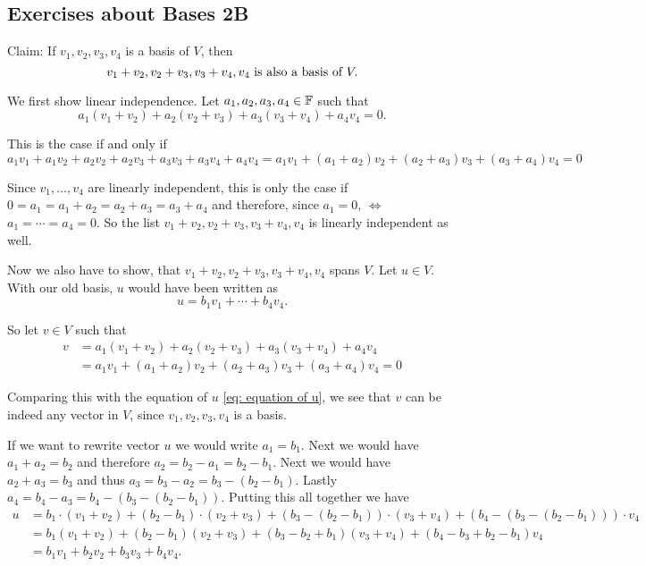 \subsection*{Exercises about Bases 2B}

\setcounter{xrcscount}{5}
\begin{xrcs}
  Claim: If $v_1, v_2, v_3, v_4$ is a basis of $V$, then
  \begin{equation}
    v_1 + v_2, v_2 + v_3, v_3+v_4, v_4 $ is also a basis of $V.
  \end{equation}

  \begin{xprf}
    \StepOne We first show linear independence. Let $a_1, a_2, a_3, a_4 \in \mathbb{F}$ such that
    \begin{equation}
      a_1 (v_1+v_2) + a_2(v_2+v_3) + a_3(v_3+v_4)+a_4 v_4 = 0.
    \end{equation}

    This is the case if and only if
    \[
    a_1 v_1 + a_1 v_2 + a_2 v_2 + a_2 v_3 + a_3 v_3 + a_3 v_4 + a_4 v_4
    = a_1 v_1 + (a_1 + a_2) v_2 + (a_2 + a_3) v_3 + (a_3 + a_4)v_4=0
    \]

    Since $v_1, \ldots, v_4$ are linearly independent, this is only the case if $0 = a_1 = a_1 + a_2 = a_2 + a_3 = a_3 + a_4$ and therefore, since $a_1=0$, $\iff$ $a_1 = \cdots = a_4 = 0$. So the list $v_1 + v_2, v_2 + v_3, v_3+v_4, v_4$ is linearly independent as well.

    \StepTwo Now we also have to show, that $v_1 + v_2, v_2 + v_3, v_3+v_4, v_4$ spans $V$. Let $u \in V$. With our old basis, $u$ would have been written as
    \begin{equation}
      \label{eq: equation of u}
      u = b_1 v_1 + \cdots + b_4 v_4.
    \end{equation}

    So let $v \in V$ such that
    \[
      \begin{aligned}
        v
        & = a_1 (v_1+v_2) + a_2(v_2+v_3) + a_3(v_3+v_4)+a_4 v_4 \\
        & = a_1 v_1 + (a_1 + a_2) v_2 + (a_2 + a_3) v_3 + (a_3 + a_4)v_4=0
      \end{aligned}
    \]

    Comparing this with the equation of $u$ \eqref{eq: equation of u}, we see that $v$ can be indeed any vector in $V$, since $v_1, v_2, v_3, v_4$ is a basis.

    If we want to rewrite vector $u$ we would write $a_1 = b_1.$ Next we would have $a_1 + a_2 = b_2$ and therefore $a_2 = b_2 - a_1 = b_2-b_1$. Next we would have $a_2+a_3=b_3$ and thus $a_3= b_3-a_2 = b_3 - (b_2-b_1)$. Lastly $a_4 = b_4-a_3 = b_4-(b_3 - (b_2-b_1))$. Putting this all together we have
    \[
      \begin{aligned}
        u
        & = b_1 \cdot (v_1+v_2) + (b_2-b_1)\cdot(v_2+v_3) + (b_3 - (b_2-b_1)) \cdot (v_3 + v_4) + (b_4-(b_3 - (b_2-b_1))) \cdot v_4 \\
        & = b_1  (v_1+v_2) + (b_2-b_1)(v_2+v_3) + (b_3 - b_2+b_1)  (v_3 + v_4) + (b_4-b_3+b_2-b_1)  v_4 \\
        & = b_1 v_1 + b_2 v_2 + b_3 v_3 + b_4 v_4.
      \end{aligned}
    \]


\end{xprf}
\end{xrcs}
